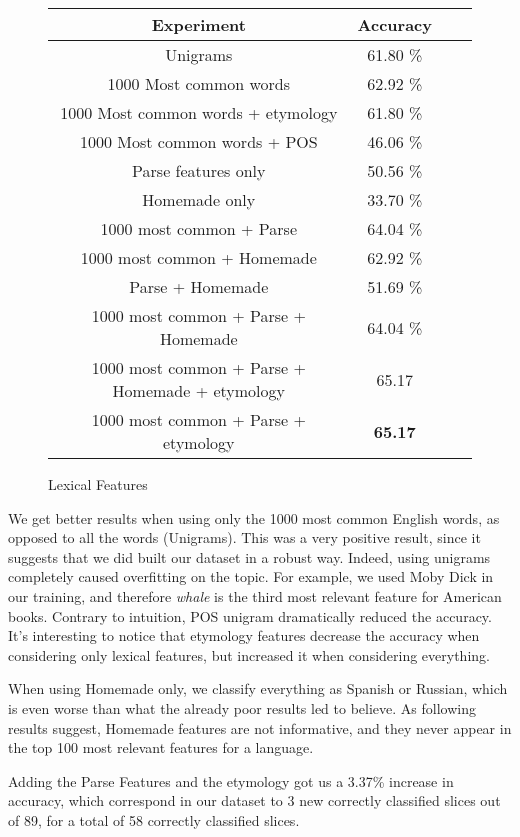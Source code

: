 \documentclass[10pt]{article}
\begin{document}
\begin{figure}[h]
\centering\begin{tabular}{|c|c|c|c|}
\hline 
Experiment & Accuracy \\
\hline 
Unigrams & 61.80 \% \\
1000 Most common words & 62.92 \%  \\
1000 Most common words + etymology & 61.80 \%  \\
1000 Most common words + POS & 46.06 \%  \\
\hline
Parse features only & 50.56 \%\\
\hline
Homemade only & 33.70 \%\\
\hline
1000 most common + Parse & 64.04 \%\\
1000 most common + Homemade & 62.92 \%\\
Parse + Homemade & 51.69 \%\\
\hline
1000 most common + Parse + Homemade & 64.04 \% \\
1000 most common + Parse + Homemade + etymology & 65.17 \\
1000 most common + Parse + etymology & \textbf{65.17} \\
\hline
\end{tabular}
\caption{Lexical Features}
\end{figure}
We get better results when using only the 1000 most common English words, as opposed to all the words (Unigrams). This was a very positive result, since it suggests that we did built our dataset in a robust way. Indeed, using unigrams completely caused overfitting on the topic. For example, we used Moby Dick in our training, and therefore \emph{whale} is the third most relevant feature for American books. Contrary to intuition, POS unigram dramatically reduced the accuracy. It's interesting to notice that etymology features decrease the accuracy when considering only lexical features, but increased it when considering everything.


When using Homemade only, we classify everything as Spanish or Russian, which is even worse than what the already poor results led to believe. As following results suggest, Homemade features are not informative, and they never appear in the top 100 most relevant features for a language.


Adding the Parse Features and the etymology got us a 3.37\% increase in accuracy, which correspond in our dataset to 3 new correctly classified slices out of 89, for a total of 58 correctly classified slices.
\end{document}
